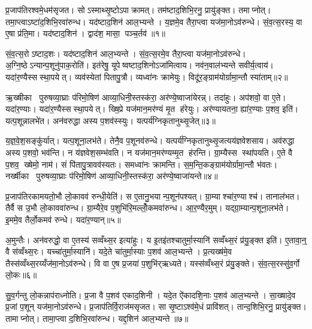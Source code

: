 \clearpage
{}
\setcounter{anuvakam}{0}
प्र॒जाप॑तिरश्वमे॒धम॑सृजत। सोऽस्माथ्सृ॒ष्टोऽपाक्रामत्। तम॑ष्टाद॒शिभि॒रनु॒ प्रायु॑ङ्क्त। तमाप्नोत्। तमा॒प्त्वाऽष्टा॑द॒शिभि॒रवा॑रुन्ध। यद॑ष्टाद॒शिन॑ आल॒भ्यन्ते। य॒ज्ञमे॒व तैरा॒प्त्वा यज॑मा॒नोऽव॑रुन्धे। सं॒व॒त्स॒रस्य॒ वा ए॒षा प्र॑ति॒मा। यद॑ष्टाद॒शिन॑। द्वाद॑श॒ मासा॒ पञ्च॒र्तव॑॥१॥

सं॒व॒त्स॒रोऽष्टाद॒शः। यद॑ष्टाद॒शिन॑ आल॒भ्यन्ते। सं॒व॒त्स॒रमे॒व तैरा॒प्त्वा यज॑मा॒नोऽव॑रुन्धे। अ॒ग्नि॒ष्ठेऽन्यान्प॒शूनु॑पाक॒रोति॑। इत॑रेषु॒ यूपेष्वष्टाद॒शिनोऽजा॑मित्वाय। नव॑न॒वाल॑भ्यन्ते सवीर्य॒त्वाय॑। यदा॑र॒ण्यैस्सस्था॒पयेत्। व्यव॑स्येतां पितापु॒त्रौ। व्यध्वा॑नः क्रामेयुः। विदू॑र॒ङ्ग्राम॑योर्ग्रामा॒न्तौ स्या॑ताम्॥२॥

ऋ॒ख्षीका पुरुषव्या॒घ्राः प॑रिमो॒षिण॑ आव्या॒धिनी॒स्तस्क॑रा॒ अर॑ण्ये॒ष्वाजा॑येरन्न्। तदा॑हुः। अप॑शवो॒ वा ए॒ते। यदा॑र॒ण्याः। यदा॑र॒ण्यैस्सस्था॒पयेत्। ख्षि॒प्रे यज॑मान॒मर॑ण्यं मृ॒त ह॑रेयुः। अर॑ण्यायतना॒ ह्या॑र॒ण्याः प॒शव॒ इति॑। यत्प॒शून्नालभे॑त। अन॑वरुद्धा अस्य प॒शव॑स्स्युः। यत्पर्य॑ग्निकृतानुथ्सृ॒जेत्॥३॥

य॒ज्ञ॒वे॒श॒सङ्कु॑र्यात्। यत्प॒शूना॒लभ॑ते। तेनै॒व प॒शूनव॑रुन्धे। यत्पर्य॑ग्निकृतानुथ्सृ॒जत्यय॑ज्ञवेशसाय। अव॑रुद्धा अस्य प॒शवो॒ भव॑न्ति। न य॑ज्ञवेश॒सम्भ॑वति। न यज॑मान॒मर॑ण्यम्मृ॒त ह॑रन्ति। ग्रा॒म्यैस्स स्था॑पयति। ए॒ते वै प॒शव॒ ख्षेमो॒ नाम॑। सं पि॑तापु॒त्रावव॑स्यतः। समध्वा॑नः क्रामन्ति। स॒म॒न्ति॒कङ्ग्राम॑योर्ग्रामा॒न्तौ भ॑वतः। नर्ख्षीका पुरुषव्या॒घ्राः प॑रिमो॒षिण॑ आव्या॒धिनी॒स्तस्क॑रा॒ अर॑ण्ये॒ष्वाजा॑यन्ते॥४॥\anuvakamend[ऋ॒तव॑स्स्यातामुथ्सृ॒जेथ्स्य॑त॒स्त्रीणि॑ च]

प्र॒जाप॑तिरकामयतो॒भौ लो॒कावव॑ रुन्धी॒येति॑। स ए॒तानु॒भयान्प॒शून॑पश्यत्। ग्रा॒म्याश्चा॑र॒ण्याश्च॑। तानाल॑भत। तैर्वै स उ॒भौ लो॒काववा॑रुन्ध। ग्रा॒म्यैरे॒व प॒शुभि॑रि॒मल्लोँ॒कमवा॑रुन्ध। आ॒र॒ण्यैर॒मुम्। यद्ग्रा॒म्यान्प॒शूना॒लभ॑ते। इ॒ममे॒व तैर्लो॒कमव॑ रुन्धे। यदा॑र॒ण्यान्॥५॥

अ॒मुन्तैः। अन॑वरुद्धो॒ वा ए॒तस्य॑ सव्वँथ्स॒र इत्या॑हुः। य इ॒तइ॑तश्चातुर्मा॒स्यानि॑ सव्वँथ्स॒रं प्र॑यु॒ङ्क्त इति॑। ए॒तावा॒न्॒ वै स॑व्वँथ्स॒रः। यच्चा॑तुर्मा॒स्यानि॑। यदे॒ते चा॑तुर्मा॒स्याः प॒शव॑ आल॒भ्यन्ते। प्र॒त्यख्ष॑मे॒व तैस्स॑व्वँथ्स॒रय्यँज॑मा॒नोऽव॑रुन्धे। वि वा ए॒ष प्र॒जया॑ प॒शुभि॑र्‌ऋध्यते। यस्स॑व्वँथ्स॒रं प्र॑यु॒ङ्क्ते। सं॒व॒त्स॒रस्सु॑व॒र्गो लो॒कः॥६॥

सु॒व॒र्गन्तु लो॒कन्नाप॑राध्नोति। प्र॒जा वै प॒शव॑ एकाद॒शिनी। यदे॒त ऐ॑कादशि॒नाः प॒शव॑ आल॒भ्यन्ते। सा॒ख्षादे॒व प्र॒जां प॒शून् यज॑मा॒नोऽव॑रुन्धे। प्र॒जाप॑तिर्वि॒राज॑मसृजत। सा सृ॒ष्टाऽश्व॑मे॒धं प्रावि॑शत्। तान्द॒शिभि॒रनु॒ प्रायु॑ङ्क्त। तामाप्नोत्। तामा॒प्त्वा द॒शिभि॒रवा॑रुन्ध। यद्द॒शिन॑ आल॒भ्यन्ते॥७॥

